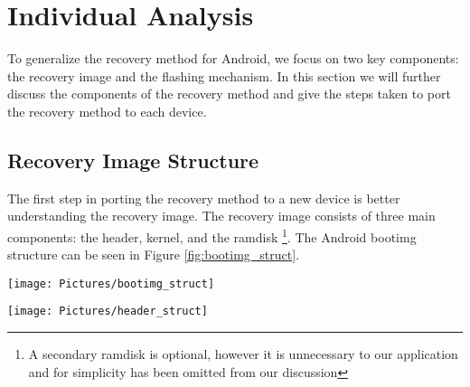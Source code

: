 %
%

\chapter{Individual Analysis}
\label{sec:implementation}
%

To generalize the recovery method for Android, we focus on two key components:  the recovery image and the flashing mechanism.  In this section we will further discuss the components of the recovery method and give the steps taken to port the recovery method to each device.

\section{Recovery Image Structure}
\label{sec:boot_image}	


The first step in porting the recovery method to a new device is better understanding the recovery image.  The recovery image consists of three main components: the header, kernel, and the ramdisk \footnote{A secondary ramdisk is optional, however it is unnecessary to our application and for simplicity has been omitted from our discussion}.  The Android bootimg structure can be seen in Figure \ref{fig:bootimg_struct}. 

\begin{figure*}[!t]
\centering
\texttt{[image: Pictures/bootimg\_struct]}
\caption{\label{fig:bootimg_struct}
{\bf Bootimg Structure}: structure of a common Android bootimg}
\end{figure*}

\begin{figure*}[!t]
\centering
\texttt{[image: Pictures/header\_struct]}
\caption{\label{fig:header_struct}
{\bf Header Structure}: structure of a common Android bootimg header}
\end{figure*}
	 
